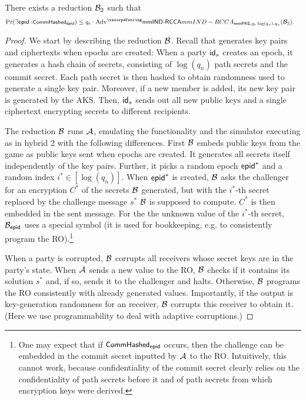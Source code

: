 \begin{lemma}
  There exists a reduction $\Bdv[2]$ such that
  \begin{align*}
    \Pr(\exists \hgnodeid : &\commitHash_{\hgnodeid}) \leq q_e\cdot\textnormal{Adv}^\mmindrcca_{\mmPKE,q_e\log(q_n),q_n}(\Bdv[2]).
  \end{align*}
\end{lemma}
\begin{proof}
We start by describing the reduction $\Bdv$. Recall that \saik generates \mmPKE key pairs and ciphertexts when epochs are created: When a party $\id_s$ creates an epoch, it generates a hash chain of secrets, consisting of $\log(q_n)$ path secrets and the commit secret. Each path secret is then hashed to obtain randomness used to generate a single key pair. Moreover, if a new member is added, its new \mmPKE key pair is generated by the AKS. Then, $\id_s$ sends out all new public keys and a single ciphertext encrypting secrets to different recipients.

The reduction $\Bdv$ runs $\Adv$, emulating the functionality and the simulator executing \saik as in hybrid 2 with the following differences. First $\Bdv$ embeds public keys from the \mmowrcca game as public keys sent when epochs are created. It generates all secrets itself independently of the key pairs. Further, it picks a random epoch $\hgnodeid^*$ and a random index $i^* \in [\log(q_n)]$. When $\hgnodeid^*$ is created, $\Bdv$ asks the challenger for an encryption $C^*$ of the secrets $\Bdv$ generated, but with the $i^*$-th secret replaced by the challenge message $s^*$ $\Bdv$ is supposed to compute. $C^*$ is then embedded in the sent message. For the the unknown value of the $i^*$-th secret, $\Bdv[\hgnodeid]$ uses a special symbol  (it is used for bookkeeping, e.g. to consistently program the RO).\footnote{One
  may expect that if $\commitHash_\hgnodeid$ occurs, then the challenge can be embedded in the commit secret inputted by $\Adv$ to the RO. Intuitively, this cannot work, because confidentiality of the commit secret clearly relies on the confidentiality of path secrets before it and of path secrets from which encryption keys were derived.
}

When a party is corrupted, $\Bdv$ corrupts all receivers whose secret keys are in the party's state. When $\Adv$ sends a new value to the RO, $\Bdv$ checks if it contains its solution $s^*$ and, if so, sends it to the challenger and halts. Otherwise, $\Bdv$ programs the RO consistently with already generated values. Importantly, if the output is key-generation randomness for an \mmowrcca receiver, $\Bdv$ corrupts this receiver to obtain it. (Here we use programmability to deal with adaptive corruptions.)


\end{proof}
